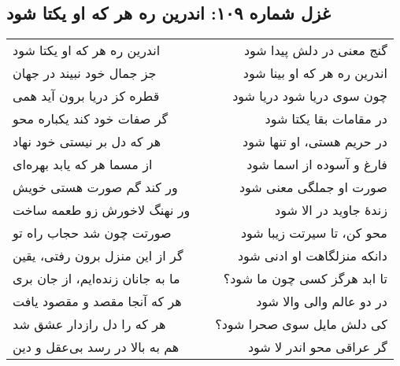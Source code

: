 \begin{center}
\section*{غزل شماره ۱۰۹: اندرین ره هر که او یکتا شود}
\label{sec:109}
\begin{longtable}{l p{0.5cm} r}
اندرین ره هر که او یکتا شود
&&
گنج معنی در دلش پیدا شود
\\
جز جمال خود نبیند در جهان
&&
اندرین ره هر که او بینا شود
\\
قطره کز دریا برون آید همی
&&
چون سوی دریا شود دریا شود
\\
گر صفات خود کند یکباره محو
&&
در مقامات بقا یکتا شود
\\
هر که دل بر نیستی خود نهاد
&&
در حریم هستی، او تنها شود
\\
از مسما هر که یابد بهره‌ای
&&
فارغ و آسوده از اسما شود
\\
ور کند گم صورت هستی خویش
&&
صورت او جملگی معنی شود
\\
ور نهنگ لاخورش زو طعمه ساخت
&&
زندهٔ جاوید در الا شود
\\
صورتت چون شد حجاب راه تو
&&
محو کن، تا سیرتت زیبا شود
\\
گر از این منزل برون رفتی، یقین
&&
دانکه منزلگاهت او ادنی شود
\\
ما به جانان زنده‌ایم، از جان بری
&&
تا ابد هرگز کسی چون ما شود؟
\\
هر که آنجا مقصد و مقصود یافت
&&
در دو عالم والی والا شود
\\
هر که را دل رازدار عشق شد
&&
کی دلش مایل سوی صحرا شود؟
\\
هم به بالا در رسد بی‌عقل و دین
&&
گر عراقی محو اندر لا شود
\\
\end{longtable}
\end{center}
